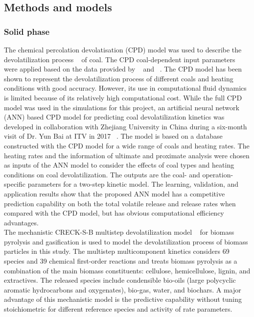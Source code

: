 \begin{btUnit}
\subsection{Methods and models} 
\subsubsection{Solid phase} 
The chemical percolation devolatisation (CPD) model was used to describe the devolatilization process ~\cite{Grant1989} of coal. The CPD coal-dependent input parameters were applied based on the data provided by ~ and ~. The CPD model has been shown to represent the devolatilization process of different coals and heating conditions with good accuracy. However, its use in computational fluid dynamics is limited because of its relatively high computational cost. While the full CPD model was used in the simulations for this project, an artificial neural network (ANN) based CPD model for predicting coal devolatilization kinetics was developed in collaboration with Zhejiang University in China during a six-month visit of Dr. Yun Bai at ITV in 2017 ~\cite{Xing2019}. The model is based on a database constructed with the CPD model for a wide range of coals and heating rates. The heating rates and the information of ultimate and proximate analysis were chosen as inputs of the ANN model to consider the effects of coal types and heating conditions on coal devolatilization. The outputs are the coal- and operation-specific parameters for a two-step kinetic model. The learning, validation, and application results show that the proposed ANN model has a competitive prediction capability on both the total volatile release and release rates when compared with the CPD model, but has obvious computational efficiency advantages.
\\
The mechanistic CRECK-S-B multistep devolatilization model ~\cite{Ranzi2008, Debiagi2015} for biomass pyrolysis and gasification is used to model the devolatilization process of biomass particles in this study. The multistep multicomponent kinetics considers 69 species and 39 chemical first-order reactions and treats biomass pyrolysis as a combination of the main biomass constituents: cellulose, hemicellulose, lignin, and extractives. The released species include condensible bio-oils (large polycyclic aromatic hydrocarbons and oxygenates), bio-gas, water, and biochars. A major advantage of this mechanistic model is the predictive capability without tuning stoichiometric for different reference species and activity of rate parameters.



\end{btUnit}
